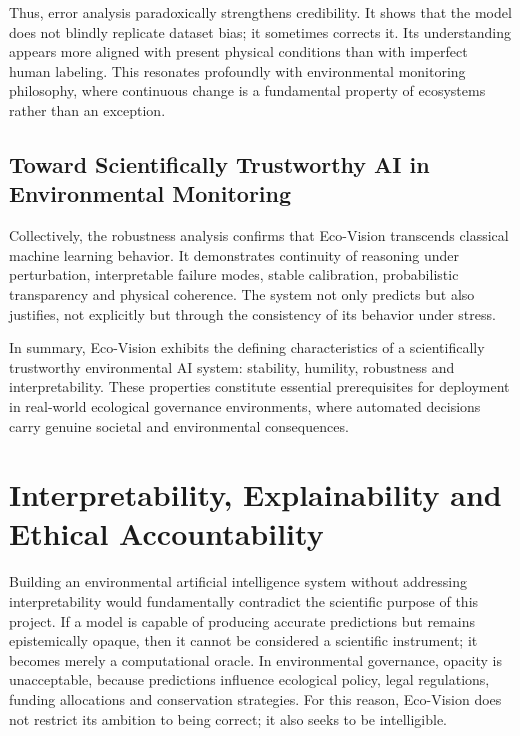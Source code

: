\documentclass[12pt,a4paper]{report}
\begin{document}
Thus, error analysis paradoxically strengthens credibility. It shows that the model does not blindly replicate dataset bias; it sometimes corrects it. Its understanding appears more aligned with present physical conditions than with imperfect human labeling. This resonates profoundly with environmental monitoring philosophy, where continuous change is a fundamental property of ecosystems rather than an exception.

\section{Toward Scientifically Trustworthy AI in Environmental Monitoring}

Collectively, the robustness analysis confirms that Eco-Vision transcends classical machine learning behavior. It demonstrates continuity of reasoning under perturbation, interpretable failure modes, stable calibration, probabilistic transparency and physical coherence. The system not only predicts but also justifies, not explicitly but through the consistency of its behavior under stress.

In summary, Eco-Vision exhibits the defining characteristics of a scientifically trustworthy environmental AI system: stability, humility, robustness and interpretability. These properties constitute essential prerequisites for deployment in real-world ecological governance environments, where automated decisions carry genuine societal and environmental consequences.

\newpage

\chapter{Interpretability, Explainability and Ethical Accountability}

Building an environmental artificial intelligence system without addressing interpretability would fundamentally contradict the scientific purpose of this project. If a model is capable of producing accurate predictions but remains epistemically opaque, then it cannot be considered a scientific instrument; it becomes merely a computational oracle. In environmental governance, opacity is unacceptable, because predictions influence ecological policy, legal regulations, funding allocations and conservation strategies. For this reason, Eco-Vision does not restrict its ambition to being correct; it also seeks to be intelligible.
\end{document}
